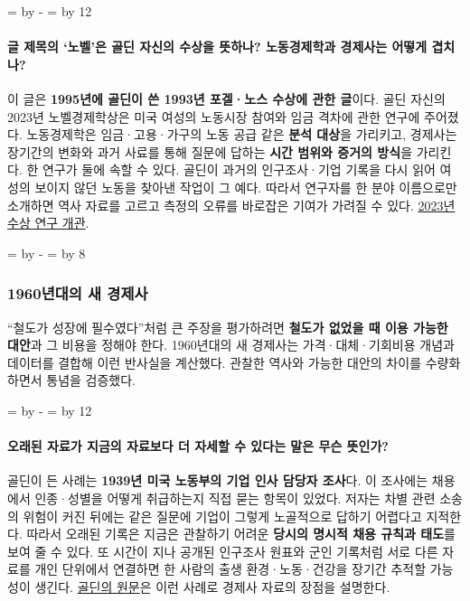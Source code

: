 \documentclass[10pt,a4paper]{article}
\newcommand{\ReserveQuestionSpace}{%
  \par\begingroup
  \dimen0=\pagegoal \advance\dimen0 by -\pagetotal
  \dimen2=\baselineskip \multiply\dimen2 by 12
  \ifdim\dimen0<\dimen2 \newpage\fi
  \endgroup}
\newcommand{\ReserveReadingSectionSpace}{%
  \par\begingroup
  \dimen0=\pagegoal \advance\dimen0 by -\pagetotal
  \dimen2=\baselineskip \multiply\dimen2 by 8
  \ifdim\dimen0<\dimen2 \newpage\fi
  \endgroup}
\begin{document}
\ReserveQuestionSpace
\paragraph{글 제목의 ‘노벨’은 골딘 자신의 수상을 뜻하나? 노동경제학과 경제사는 어떻게 겹치나?}
이 글은 \textbf{1995년에 골딘이 쓴 1993년 포겔·노스 수상에 관한 글}이다. 골딘 자신의 2023년 노벨경제학상은 미국 여성의 노동시장 참여와 임금 격차에 관한 연구에 주어졌다. 노동경제학은 임금·고용·가구의 노동 공급 같은 \textbf{분석 대상}을 가리키고, 경제사는 장기간의 변화와 과거 사료를 통해 질문에 답하는 \textbf{시간 범위와 증거의 방식}을 가리킨다. 한 연구가 둘에 속할 수 있다. 골딘이 과거의 인구조사·기업 기록을 다시 읽어 여성의 보이지 않던 노동을 찾아낸 작업이 그 예다. 따라서 연구자를 한 분야 이름으로만 소개하면 역사 자료를 고르고 측정의 오류를 바로잡은 기여가 가려질 수 있다. \href{https://www.nobelprize.org/prizes/economic-sciences/2023/goldin/facts/}{2023년 수상 연구 개관}.\par

\ReserveReadingSectionSpace
\subsubsection*{1960년대의 새 경제사}

“철도가 성장에 필수였다”처럼 큰 주장을 평가하려면 \textbf{철도가 없었을 때 이용 가능한 대안}과 그 비용을 정해야 한다. 1960년대의 새 경제사는 가격·대체·기회비용 개념과 데이터를 결합해 이런 반사실을 계산했다. 관찰한 역사와 가능한 대안의 차이를 수량화하면서 통념을 검증했다.\par

\ReserveQuestionSpace
\paragraph{오래된 자료가 지금의 자료보다 더 자세할 수 있다는 말은 무슨 뜻인가?}
골딘이 든 사례는 \textbf{1939년 미국 노동부의 기업 인사 담당자 조사}다. 이 조사에는 채용에서 인종·성별을 어떻게 취급하는지 직접 묻는 항목이 있었다. 저자는 차별 관련 소송의 위험이 커진 뒤에는 같은 질문에 기업이 그렇게 노골적으로 답하기 어렵다고 지적한다. 따라서 오래된 기록은 지금은 관찰하기 어려운 \textbf{당시의 명시적 채용 규칙과 태도}를 보여 줄 수 있다. 또 시간이 지나 공개된 인구조사 원표와 군인 기록처럼 서로 다른 자료를 개인 단위에서 연결하면 한 사람의 출생 환경·노동·건강을 장기간 추적할 가능성이 생긴다. \href{https://goldin.scholars.harvard.edu/sites/g/files/omnuum5966/files/goldin/files/cliometrics.pdf}{골딘의 원문}은 이런 사례로 경제사 자료의 장점을 설명한다.\par
\end{document}
